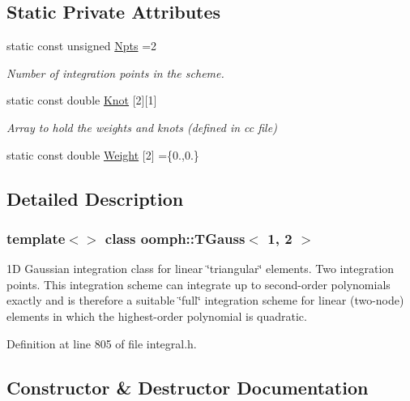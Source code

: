 \subsection*{Static Private Attributes}
\begin{DoxyCompactItemize}
\item 
static const unsigned \hyperlink{classoomph_1_1TGauss_3_011_00_012_01_4_ae020377e678963b7dcc514903776fbcb}{Npts} =2
\begin{DoxyCompactList}\small\item\em Number of integration points in the scheme. \end{DoxyCompactList}\item 
static const double \hyperlink{classoomph_1_1TGauss_3_011_00_012_01_4_a53a61e7a0c771e97f139cf2e17831454}{Knot} \mbox{[}2\mbox{]}\mbox{[}1\mbox{]}
\begin{DoxyCompactList}\small\item\em Array to hold the weights and knots (defined in cc file) \end{DoxyCompactList}\item 
static const double \hyperlink{classoomph_1_1TGauss_3_011_00_012_01_4_a8445706d073b901d94dd558b0e838944}{Weight} \mbox{[}2\mbox{]} =\{0.,0.\}
\end{DoxyCompactItemize}


\subsection{Detailed Description}
\subsubsection*{template$<$$>$\newline
class oomph\+::\+T\+Gauss$<$ 1, 2 $>$}

1D Gaussian integration class for linear \char`\"{}triangular\char`\"{} elements. Two integration points. This integration scheme can integrate up to second-\/order polynomials exactly and is therefore a suitable \char`\"{}full\char`\"{} integration scheme for linear (two-\/node) elements in which the highest-\/order polynomial is quadratic. 

Definition at line 805 of file integral.\+h.



\subsection{Constructor \& Destructor Documentation}
\mbox{\label{classoomph_1_1TGauss_3_011_00_012_01_4_aace4f5228a7d94f5212936a84d72c60b}} 
